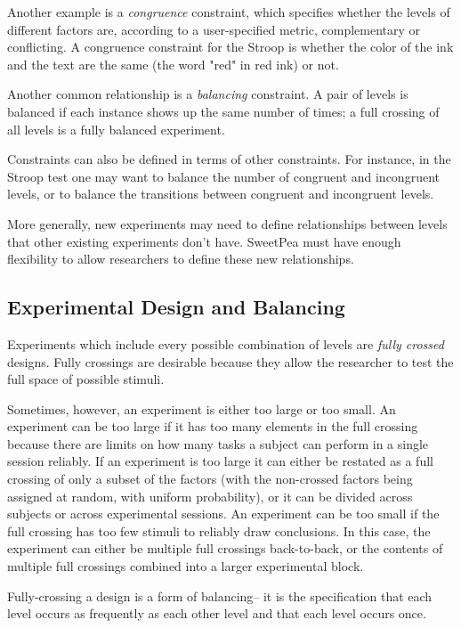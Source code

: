 Another example is a \emph{congruence} constraint, which specifies whether the levels of different factors are, according to a user-specified metric, complementary or conflicting. A congruence constraint for the Stroop is whether the color of the ink and the text are the same (the word "red" in red ink) or not.

Another common relationship is a \emph{balancing} constraint. A pair of levels is balanced if each instance shows up the same number of times; a full crossing of all levels is a fully balanced experiment.

Constraints can also be defined in terms of other constraints. For instance, in the Stroop test one may want to balance the number of congruent and incongruent levels, or to balance the transitions between congruent and incongruent levels.

More generally, new experiments may need to define relationships between levels that other existing experiments don't have. SweetPea must have enough flexibility to allow researchers to define these new relationships.

\subsection{Experimental Design and Balancing}

Experiments which include every possible combination of levels are \emph{fully crossed} designs. Fully crossings are desirable because they allow the researcher to test the full space of possible stimuli.

Sometimes, however, an experiment is either too large or too small. An experiment can be too large if it has too many elements in the full crossing because there are limits on how many tasks a subject can perform in a single session reliably. If an experiment is too large it can either be restated as a full crossing of only a subset of the factors (with the non-crossed factors being assigned at random, with uniform probability), or it can be divided across subjects or across experimental sessions. An experiment can be too small if the full crossing has too few stimuli to reliably draw conclusions. In this case, the experiment can either be multiple full crossings back-to-back, or the contents of multiple full crossings combined into a larger experimental block.

Fully-crossing a design is a form of balancing-- it is the specification that each level occurs as frequently as each other level and that each level occurs once.

